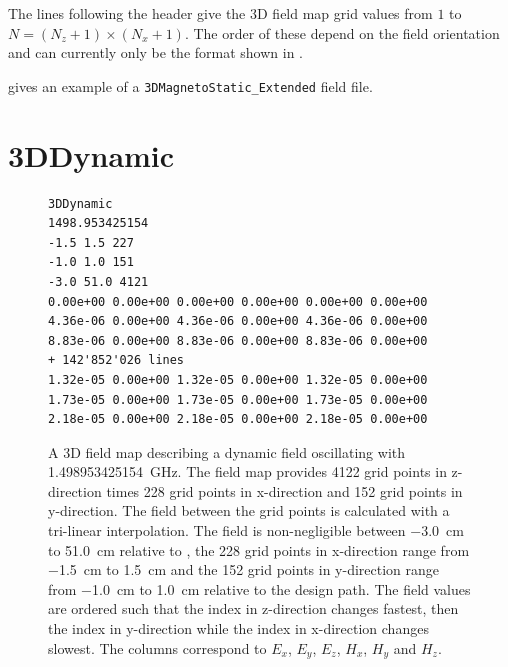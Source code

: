 The lines following the header give the 3D field map grid values from $1$ to $N= (N_{z} + 1) \times (N_{x} + 1)$.
The order of these depend on the field orientation  and can currently only be the
format shown in .

 gives an example of a \texttt{3DMagnetoStatic\_Extended} field file.

\clearpage
\section{3DDynamic}
\label{sec:3DDynamic}
\begin{figure}[h]
  \begin{fmpage}
\begin{verbatim}
3DDynamic
1498.953425154
-1.5 1.5 227
-1.0 1.0 151
-3.0 51.0 4121
0.00e+00 0.00e+00 0.00e+00 0.00e+00 0.00e+00 0.00e+00
4.36e-06 0.00e+00 4.36e-06 0.00e+00 4.36e-06 0.00e+00
8.83e-06 0.00e+00 8.83e-06 0.00e+00 8.83e-06 0.00e+00
+ 142'852'026 lines
1.32e-05 0.00e+00 1.32e-05 0.00e+00 1.32e-05 0.00e+00
1.73e-05 0.00e+00 1.73e-05 0.00e+00 1.73e-05 0.00e+00
2.18e-05 0.00e+00 2.18e-05 0.00e+00 2.18e-05 0.00e+00
\end{verbatim}
  \end{fmpage}
  \caption[Example of a 3DDynamic field map]{A 3D field map describing a dynamic field oscillating with \SI{1.498953425154}{\giga\hertz}.
    The field map provides 4122 grid points in z-direction times 228 grid points in x-direction and 152 grid points in y-direction.
    The field between the grid points is calculated with a tri-linear interpolation. The field is non-negligible between \SI{-3.0}{\centi\meter}
    to \SI{51.0}{\centi\meter} relative to , the 228 grid points in x-direction range from \SI{-1.5}{\centi\meter} to \SI{1.5}{\centi\meter} and the 152 grid
    points in y-direction range from \SI{-1.0}{\centi\meter} to \SI{1.0}{\centi\meter} relative to the design path. The field values are ordered such that the index in z-direction changes fastest, then the index in y-direction while the index in x-direction changes
    slowest. The columns correspond to $E_x$, $E_y$, $E_z$, $H_x$, $H_y$ and $H_z$.}
  \label{fig:3DDynamic}
\end{figure}


